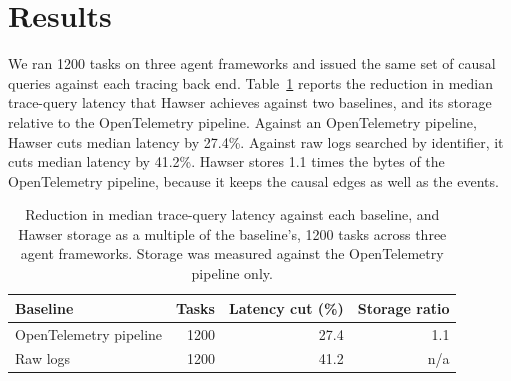 \section{Results}
\label{sec:results}

We ran 1200 tasks on three agent frameworks and issued the same set of causal queries against each tracing back end.
Table~\ref{tab:results} reports the reduction in median trace-query latency that Hawser achieves against two baselines, and its storage relative to the OpenTelemetry pipeline.
Against an OpenTelemetry pipeline, Hawser cuts median latency by 27.4\%.
Against raw logs searched by identifier, it cuts median latency by 41.2\%.
Hawser stores 1.1 times the bytes of the OpenTelemetry pipeline, because it keeps the causal edges as well as the events.

\begin{table}[t]
  \centering
  \caption{Reduction in median trace-query latency against each baseline, and Hawser storage as a multiple of the baseline's, 1200 tasks across three agent frameworks. Storage was measured against the OpenTelemetry pipeline only.}
  \label{tab:results}
  \begin{tabular}{lrrr}
    \toprule
    Baseline & Tasks & Latency cut (\%) & Storage ratio \\
    \midrule
    OpenTelemetry pipeline & 1200 & 27.4 & 1.1 \\
    Raw logs & 1200 & 41.2 & n/a \\
    \bottomrule
  \end{tabular}
\end{table}
